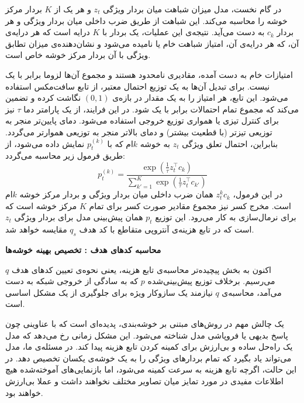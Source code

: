 در گام نخست، مدل میزان شباهت میان بردار ویژگی
$z_t$
و هر یک از 
$K$
بردار مرکز خوشه را محاسبه می‌کند. این شباهت از طریق ضرب داخلی میان بردار ویژگی و هر بردار $c_k$
به دست می‌آید. نتیجه‌ی این عملیات، یک بردار با 
$K$
درایه است که هر درایه‌ی آن، که هر درایه‌ی آن، امتیاز شباهت خام یا  نامیده می‌شود و نشان‌دهنده‌ی میزان تطابق ویژگی با آن بردار مرکز خوشه خاص است.

امتیازات خام به دست آمده، مقادیری نامحدود هستند و مجموع آن‌ها لزوما برابر با یک نیست. برای تبدیل آن‌ها به یک توزیع احتمال معتبر، از تابع سافت‌مکس استفاده می‌شود. این تابع، هر امتیاز را به یک مقدار در بازه‌ی $(0, 1)$ نگاشت کرده و تضمین می‌کند که مجموع تمام احتمالات برابر با یک شود. در این فرایند، از یک پارامتر دما $\tau$ نیز برای کنترل تیزی یا همواری توزیع خروجی استفاده می‌شود. دمای پایین‌تر منجر به توزیعی تیزتر (با قطعیت بیشتر) و دمای بالاتر منجر به توزیعی هموارتر می‌گردد. بنابراین، احتمال تعلق ویژگی 
$z_t$
به خوشه 
$k$ام که با
$p_t^{(k)}$
نمایش داده می‌شود، از طریق فرمول زیر محاسبه می‌گردد:
\begin{equation}
p_t^{(k)} = \frac{\exp(\frac{1}{\tau} z_t^\top c_k)}{\sum_{k'=1}^{K} \exp(\frac{1}{\tau} z_t^\top c_{k'})}
\label{eq:swav-p-calculation}
\end{equation}
در این فرمول،
$z_t^kc_k$
همان ضرب داخلی میان بردار ویژگی و بردار مرکز خوشه $k$ام است.
مخرج کسر نیز مجموع مقادیر صورت کسر برای تمام 
$K$
مرکز خوشه است که برای نرمال‌سازی به کار می‌رود. این توزیع
$p_t$
همان پیش‌بینی مدل برای بردار ویژگی $z_t$ است که در تابع هزینه‌ی آنتروپی متقاطع با کد هدف
$q_s$
مقایسه خواهد شد.

\vspace{0.5em}
\noindent\textbf{محاسبه کدهای هدف : تخصیص بهینه خوشه‌ها}

اکنون به بخش پیچیده‌تر محاسبه‌ی تابع هزینه، یعنی نحوه‌ی تعیین کدهای هدف 
$q$
می‌رسیم. برخلاف توزیع پیش‌بینی‌شده 
$p$
که به سادگی از خروجی شبکه به دست می‌آمد، محاسبه‌ی 
$q$
نیازمند یک سازوکار ویژه برای جلوگیری از یک مشکل اساسی است.

یک چالش مهم در روش‌های مبتنی بر خوشه‌بندی، پدیده‌ای است که با عناوینی چون پاسخ بدیهی
یا فروپاشی مدل
شناخته می‌شود. این مشکل زمانی رخ می‌دهد که مدل یک راه‌حل ساده و بی‌ارزش برای کمینه کردن تابع هزینه پیدا کند. در مسئله‌ی ما، مدل می‌تواند یاد بگیرد که تمام بردارهای ویژگی را به یک خوشه‌ی یکسان تخصیص دهد. در این حالت، اگرچه تابع هزینه به سرعت کمینه می‌شود، اما بازنمایی‌های آموخته‌شده هیچ اطلاعات مفیدی در مورد تمایز میان تصاویر مختلف نخواهند داشت و عملا بی‌ارزش خواهند بود.


